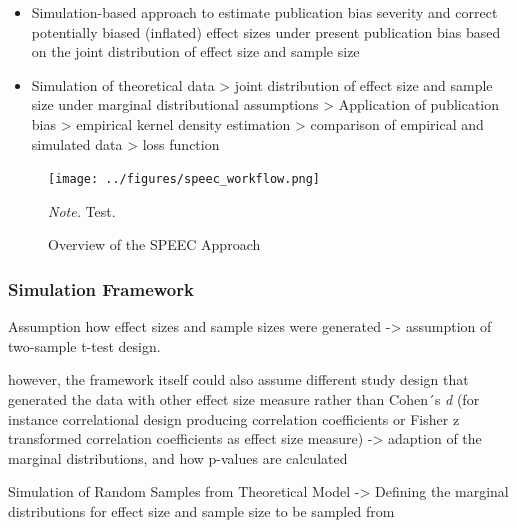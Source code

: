 \documentclass[
  12pt,
]{scrartcl}
\providecommand{\tightlist}{%
  \setlength{\itemsep}{0pt}\setlength{\parskip}{0pt}}\usepackage{longtable,booktabs,array}
\begin{document}
\begin{itemize}
\tightlist
\item
  Simulation-based approach to estimate publication bias severity and
  correct potentially biased (inflated) effect sizes under present
  publication bias based on the joint distribution of effect size and
  sample size
\item
  Simulation of theoretical data \textgreater{} joint distribution of
  effect size and sample size under marginal distributional assumptions
  \textgreater{} Application of publication bias \textgreater{}
  empirical kernel density estimation \textgreater{} comparison of
  empirical and simulated data \textgreater{} loss function
\end{itemize}

\begin{figure}[H]
\caption{Overview of the SPEEC Approach\label{fig:speec}}

\begin{center}
\texttt{[image: ../figures/speec\_workflow.png]}
\end{center}

\begingroup
\footnotesize
\textit{Note.} Test.
\endgroup
\end{figure}

\subsubsection{Simulation Framework}\label{simulation-framework}

Assumption how effect sizes and sample sizes were generated
-\textgreater{} assumption of two-sample t-test design.

however, the framework itself could also assume different study design
that generated the data with other effect size measure rather than
Cohen´s \emph{d} (for instance correlational design producing
correlation coefficients or Fisher z transformed correlation
coefficients as effect size measure) -\textgreater{} adaption of the
marginal distributions, and how p-values are calculated

Simulation of Random Samples from Theoretical Model -\textgreater{}
Defining the marginal distributions for effect size and sample size to
be sampled from
\end{document}

